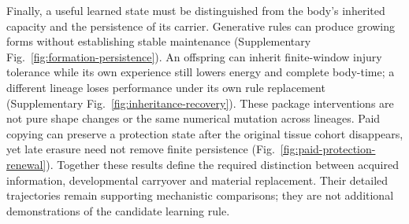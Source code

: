 Finally, a useful learned state must be distinguished from the body's inherited capacity and the persistence of its carrier. Generative rules can produce growing forms without establishing stable maintenance (Supplementary Fig.~\ref{fig:formation-persistence}). An offspring can inherit finite-window injury tolerance while its own experience still lowers energy and complete body-time; a different lineage loses performance under its own rule replacement (Supplementary Fig.~\ref{fig:inheritance-recovery}). These package interventions are not pure shape changes or the same numerical mutation across lineages. Paid copying can preserve a protection state after the original tissue cohort disappears, yet late erasure need not remove finite persistence (Fig.~\ref{fig:paid-protection-renewal}). Together these results define the required distinction between acquired information, developmental carryover and material replacement. Their detailed trajectories remain supporting mechanistic comparisons; they are not additional demonstrations of the candidate learning rule.









